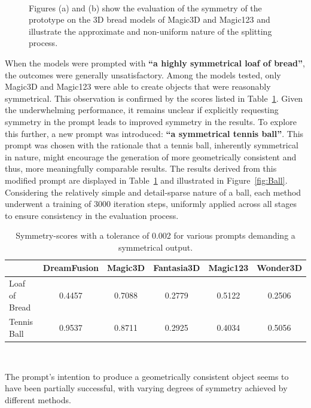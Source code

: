 \begin{figure}[ht]
\begin{subfigure}[b]{0.248\textwidth}
        \caption{}
    \end{subfigure}
    \caption{Figures (a) and (b) show the evaluation of the symmetry of the prototype on the 3D bread models of Magic3D and Magic123 and illustrate the approximate and non-uniform nature of the splitting process.}~\label{fig:split}
\end{figure}

When the models were prompted with \textbf{``a highly symmetrical loaf of bread''}, the outcomes were generally unsatisfactory. Among the models tested, only Magic3D and Magic123 were able to create objects that were reasonably symmetrical. This observation is confirmed by the scores listed in Table~\ref{table:symmetryScores}. Given the underwhelming performance, it remains unclear if explicitly requesting symmetry in the prompt leads to improved symmetry in the results. To explore this further, a new prompt was introduced: \textbf{``a symmetrical tennis ball''}. This prompt was chosen with the rationale that a tennis ball, inherently symmetrical in nature, might encourage the generation of more geometrically consistent and thus, more meaningfully comparable results. The results derived from this modified prompt are displayed in Table~\ref{table:symmetryScores} and illustrated in Figure~\ref{fig:Ball}. Considering the relatively simple and detail-sparse nature of a ball, each method underwent a training of 3000 iteration steps, uniformly applied across all stages to ensure consistency in the evaluation process.

\begin{table}[ht]
    \centering
    \small
    \begin{tabular}{lccccc}
    \toprule
    {} & DreamFusion & Magic3D & Fantasia3D & Magic123 & Wonder3D \\
    \midrule
    Loaf of Bread & 0.4457 & 0.7088 & 0.2779 & 0.5122 & 0.2506 \\
    Tennis Ball & 0.9537 & 0.8711 & 0.2925 & 0.4034 & 0.5056 \\
    \bottomrule
    \end{tabular}
    \caption{Symmetry-scores with a tolerance of 0.002 for various prompts demanding a symmetrical output.}~\label{table:symmetryScores}
\end{table}

The prompt's intention to produce a geometrically consistent object seems to have been partially successful, with varying degrees of symmetry achieved by different methods.

